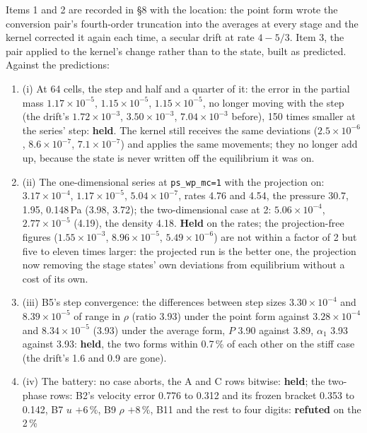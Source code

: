 \documentclass[11pt,a4paper]{article}
\newcommand{\code}[1]{\texttt{\small #1}}
\begin{document}
Items 1 and 2 are recorded in \S8 with the location: the point form
wrote the conversion pair's fourth-order truncation into the averages at
every stage and the kernel corrected it again each time, a secular
drift at rate $4 - 5/3$.  Item 3, the pair applied to the kernel's
change rather than to the state, built as predicted.  Against the
predictions:
\begin{enumerate}[nosep]
\item (i) At 64 cells, the step and half and a quarter of it: the error
      in the partial mass $1.17\times10^{-5}$, $1.15\times10^{-5}$,
      $1.15\times10^{-5}$, no longer moving with the step (the drift's
      $1.72\times10^{-3}$, $3.50\times10^{-3}$, $7.04\times10^{-3}$
      before), 150 times smaller at the series' step: \textbf{held}.
      The kernel still receives the same deviations ($2.5\times10^{-6}$,
      $8.6\times10^{-7}$, $7.1\times10^{-7}$) and applies the same
      movements; they no longer add up, because the state is never
      written off the equilibrium it was on.
\item (ii) The one-dimensional series at \code{ps\_wp\_mc=1} with the
      projection on: $3.17\times10^{-4}$, $1.17\times10^{-5}$,
      $5.04\times10^{-7}$, rates 4.76 and 4.54, the pressure 30.7, 1.95,
      0.148\,Pa (3.98, 3.72); the two-dimensional case at 2:
      $5.06\times10^{-4}$, $2.77\times10^{-5}$ (4.19), the density 4.18.
      \textbf{Held} on the rates; the projection-free figures
      ($1.55\times10^{-3}$, $8.96\times10^{-5}$, $5.49\times10^{-6}$)
      are not within a factor of 2 but five to eleven times larger: the
      projected run is the better one, the projection now removing the
      stage states' own deviations from equilibrium without a cost of
      its own.
\item (iii) B5's step convergence: the differences between step sizes $3.30\times10^{-4}$ and
      $8.39\times10^{-5}$ of range in $\rho$ (ratio 3.93) under the point
      form against $3.28\times10^{-4}$ and $8.34\times10^{-5}$ (3.93)
      under the average form, $P$ 3.90 against 3.89, $\alpha_1$ 3.93
      against 3.93: \textbf{held}, the two forms within 0.7\,\% of each
      other on the stiff case (the drift's 1.6 and 0.9 are gone).
\item (iv) The battery: no case aborts, the A and C rows bitwise: \textbf{held};
      the two-phase rows: B2's velocity error 0.776 to 0.312 and its
      frozen bracket 0.353 to 0.142, B7 $u$ $+6\,\%$, B9 $\rho$ $+8\,\%$,
      B11 and the rest to four digits: \textbf{refuted} on the 2\,\%

\end{enumerate}
\end{document}
